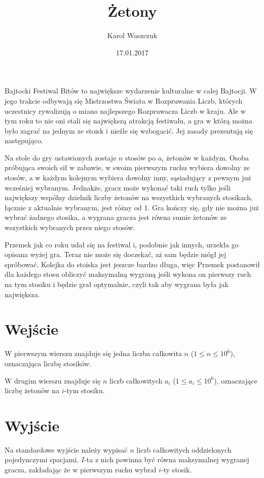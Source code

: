 \documentclass[zad,zawodnik,utf8]{sinol}
\title{Żetony}
\author{Karol Waszczuk} %
\date{17.01.2017}
\begin{document}
\begin{tasktext}%

Bajtocki Festiwal Bitów to największe wydarzenie kulturalne w całej Bajtocji. W jego trakcie odbywają się Mistrzostwa Świata w Rozpruwania Liczb, których uczestnicy rywalizują o miano najlepszego Rozpruwacza Liczb w kraju. Ale w tym roku to nie oni stali się największą atrakcją festiwalu, a gra w którą można było zagrać na jednym ze stoisk i nieźle się wzbogacić. Jej zasady prezentują się następująco.

Na stole do gry ustawionych zostaje $n$ stosów po $a_i$ żetonów w każdym. Osoba próbująca swoich sił w zabawie, w swoim pierwszym ruchu wybiera dowolny ze stosów, a w każdym kolejnym wybiera dowolny inny, sąsiadujący z pewnym już wcześniej wybranym. Jednakże, gracz może wykonać taki ruch tylko jeśli największy wspólny dzielnik liczby żetonów na wszystkich wybranych stosikach, łącznie z aktualnie wybranym, jest różny od 1. Gra kończy się, gdy nie można już wybrać żadnego stosika, a wygrana gracza jest równa sumie żetonów ze wszystkich wybranych przez niego stosów.

Przemek jak co roku udał się na festiwal i, podobnie jak innych, urzekła go opisana wyżej gra. Teraz nie może się doczekać, aż sam będzie mógł jej spróbować. Kolejka do stoiska jest jeszcze bardzo długa, więc Przemek postanowił dla każdego stosu obliczyć maksymalną wygraną jeśli wykona on pierwszy ruch na tym stosiku i będzie grał optymalnie, czyli tak aby wygrana była jak największa.

  \section{Wejście}

W pierwszym wierszu znajduje się jedna liczba całkowita $n$ ($1 \leq n \leq 10^6$), oznaczająca liczbę stosików.

W drugim wierszu znajduje się $n$ liczb całkowitych $a_i$ ($1 \leq a_i \leq 10^6$), oznaczające liczbę żetonów na $i$-tym stosiku.

  \section{Wyjście}
Na standardowe wyjście należy wypisać $n$ liczb całkowitych oddzielonych pojedynczymi spacjami. $I$-ta z nich powinna być równa maksymalnej wygranej gracza, zakładając że w pierwszym ruchu wybrał $i$-ty stosik.

\makecompactexample
\end{tasktext}
\end{document}
